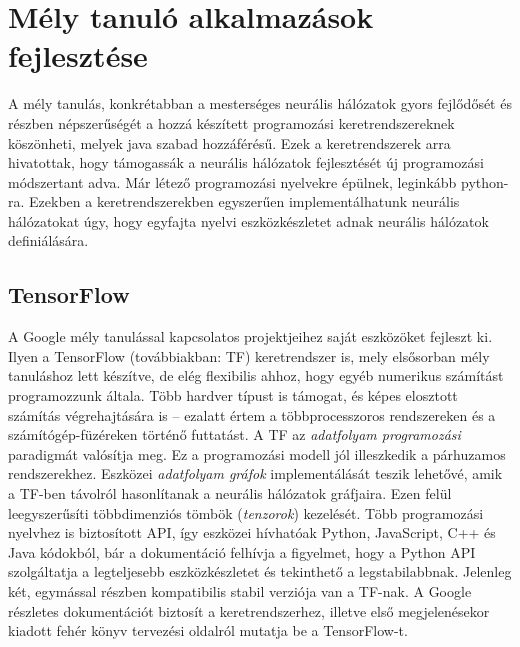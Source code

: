 \chapter{Mély tanuló alkalmazások fejlesztése}
A mély tanulás, konkrétabban a mesterséges neurális hálózatok gyors fejlődősét és részben népszerűségét a hozzá készített programozási keretrendszereknek köszönheti, melyek java szabad hozzáférésű. Ezek a keretrendszerek arra hivatottak, hogy támogassák a neurális hálózatok fejlesztését új programozási módszertant adva. Már létező programozási nyelvekre épülnek, leginkább python-ra. Ezekben a keretrendszerekben egyszerűen implementálhatunk neurális hálózatokat úgy, hogy egyfajta nyelvi eszközkészletet adnak neurális hálózatok definiálására.

\section{TensorFlow}
A Google mély tanulással kapcsolatos projektjeihez saját eszközöket fejleszt ki. Ilyen a TensorFlow (továbbiakban: TF) keretrendszer is, mely elsősorban mély tanuláshoz lett készítve, de elég flexibilis ahhoz, hogy egyéb numerikus számítást programozzunk általa. Több hardver típust is támogat, és képes elosztott számítás végrehajtására is -- ezalatt értem a többprocesszoros rendszereken és a számítógép-füzéreken történő futtatást. A TF az \emph{adatfolyam programozási} paradigmát valósítja meg. Ez a programozási modell jól illeszkedik a párhuzamos rendszerekhez. Eszközei \emph{adatfolyam gráfok} implementálását teszik lehetővé, amik a TF-ben távolról hasonlítanak a neurális hálózatok gráfjaira. Ezen felül leegyszerűsíti többdimenziós tömbök (\emph{tenzorok}) kezelését. Több programozási nyelvhez is biztosított API, így eszközei hívhatóak Python, JavaScript, C++ és Java kódokból, bár a dokumentáció felhívja a figyelmet, hogy a Python API szolgáltatja a legteljesebb eszközkészletet és tekinthető a legstabilabbnak.\cite{web:tfAPI} Jelenleg két, egymással részben kompatibilis stabil verziója van a TF-nak. A Google részletes dokumentációt biztosít a keretrendszerhez,\cite{web:tfGuide} illetve első megjelenésekor kiadott fehér könyv tervezési oldalról mutatja be a TensorFlow-t.\cite{tensorflow2015-whitepaper}

